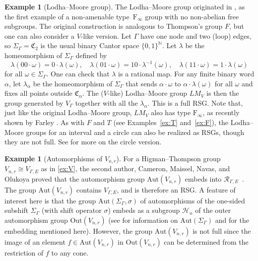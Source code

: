 \documentclass[11pt,letterpaper]{amsart}
\theoremstyle{definition}
\newtheorem{example}[theorem]{Example}
\newcommand{\N}{\mathbb{N}}
\newcommand{\R}{\mathcal{R}}
\newcommand{\C}{\mathfrak{C}}
\newcommand{\Aut}{\mathrm{Aut}}
\newcommand{\F}{\mathrm{F}}
\begin{document}
\begin{example}[Lodha--Moore group]\label{ex:LM}
The Lodha--Moore group originated in \cite{LodhaMoore,Lodha}, as the first example of a non-amenable type~$\F_{\!\infty}$ group with no non-abelian free subgroups. The original construction is analogous to Thompson's group $F$, but one can also consider a $V$-like version. Let $\Gamma$ have one node and two (loop) edges, so $\Sigma_\Gamma=\C_2$ is the usual binary Cantor space $\{0,1\}^\N$. Let $\lambda$ be the homeomorphism of $\Sigma_\Gamma$ defined by
\[
\lambda(00\cdot\omega) = 0\cdot \lambda(\omega),\quad \lambda(01\cdot\omega) = 10\cdot\lambda^{-1}(\omega),\quad \lambda(11\cdot\omega)=1\cdot\lambda(\omega)
\]
for all $\omega\in \Sigma_\Gamma$. One can check that $\lambda$ is a rational map. For any finite binary word $\alpha$, let $\lambda_\alpha$ be the homeomorphism of $\Sigma_\Gamma$ that sends $\alpha\cdot\omega$ to $\alpha\cdot\lambda(\omega)$ for all $\omega$ and fixes all points outside $\C_\alpha$. The ($V$-like) Lodha--Moore group $LM_V$ is then the group generated by $V_\Gamma$ together with all the $\lambda_\alpha$. This is a full RSG. Note that, just like the original Lodha--Moore group, $LM_V$ also has type $\F_{\!\infty}$, as recently shown by Farley \cite{Farley}. As with $F$ and $T$ (see Examples~\ref{ex:T} and~\ref{ex:F}), the Lodha--Moore groups for an interval and a circle can also be realized as RSGs, though they are not full. See \cite{LodhaCircle} for more on the circle version.
\end{example}


\begin{example}[Automorphisms of $V_{n,r}$]\label{ex:autV}
For a Higman--Thompson group $V_{n,r}\cong V_{\Gamma,E}$ as in \cref{ex:V}, the second author, Cameron, Maissel, Navas, and Olukoya proved that the automorphism group $\mathrm{Aut}(V_{n,r})$ embeds into $\R_{\Gamma,E}$~\cite{BCMNO}.  The group $\mathrm{Aut}(V_{n,r})$ contains $V_{\Gamma,E}$, and is therefore an RSG.  A feature of interest here is that the group $\mathrm{Aut}(\Sigma_\Gamma,\sigma)$ of automorphisms of the one-sided subshift $\Sigma_\Gamma$ (with shift operator $\sigma$) embeds as a subgroup $\mathcal{H}_n$ of the outer automorphism group $\mathrm{Out}(V_{n,r})$ (see \cite{Hedlund69} for information on $\mathrm{Aut}(\Sigma_\Gamma)$ and \cite{BCO} for the embedding mentioned here).  However, the group $\Aut(V_{n,r})$ is not full since the image of an element $f\in\Aut(V_{n,r})$ in $\mathrm{Out}(V_{n,r})$ can be determined from the restriction of $f$ to any cone.
\end{example}
\end{document}
